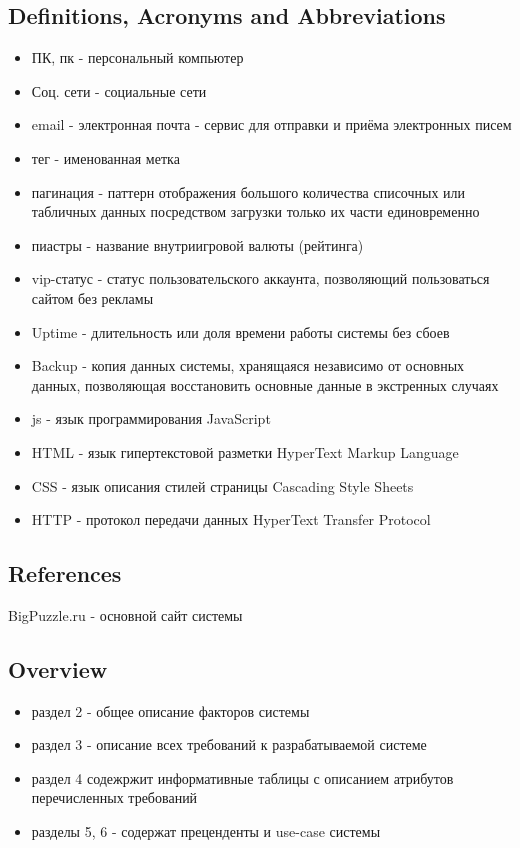 \documentclass[12pt]{article}
\begin{document}
\subsection{Definitions, Acronyms and Abbreviations}
\begin{itemize}
    \item ПК, пк - персональный компьютер
    \item Соц. сети - социальные сети
    \item email - электронная почта - сервис для отправки и приёма электронных писем
    \item тег - именованная метка
    \item пагинация - паттерн отображения большого количества списочных или табличных данных посредством загрузки только их части единовременно
    \item пиастры - название внутриигровой валюты (рейтинга)
    \item vip-статус - статус пользовательского аккаунта, позволяющий пользоваться сайтом без рекламы
    \item Uptime - длительность или доля времени работы системы без сбоев
    \item Backup - копия данных системы, хранящаяся независимо от основных данных, позволяющая восстановить основные данные в экстренных случаях
    \item js - язык программирования JavaScript
    \item HTML - язык гипертекстовой разметки HyperText Markup Language
    \item CSS - язык описания стилей страницы Cascading Style Sheets
    \item HTTP - протокол передачи данных HyperText Transfer Protocol
\end{itemize}
\subsection{References}
BigPuzzle.ru - основной сайт системы
\subsection{Overview}
\begin{itemize}
    \item раздел 2 - общее описание факторов системы
    \item раздел 3 - описание всех требований к разрабатываемой системе
    \item раздел 4 содежржит информативные таблицы с описанием атрибутов перечисленных требований
    \item разделы 5, 6 - содержат преценденты и use-case системы
\end{itemize}
\end{document}
